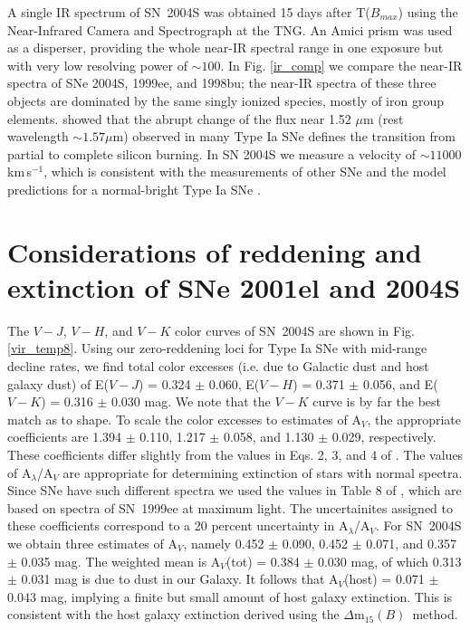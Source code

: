 \documentclass[12pt,preprint,psfig,epsf]{aastex}
\newcommand{\dmm}{\mbox{$\Delta$m$_{15}(B)$}}
\begin{document}
A single IR spectrum of SN~2004S was obtained 15 days after T($B_{max}$)
using the Near-Infrared Camera and Spectrograph at the TNG. An Amici prism
was used as a disperser, providing the whole near-IR spectral range in one
exposure but with very low resolving power of $\sim100$.
In Fig. \ref{ir_comp} we compare the near-IR spectra of SNe 2004S, 1999ee,
and 1998bu; the near-IR spectra of these three objects are dominated
by the same singly ionized species, mostly of iron group elements.
\citet{Mar_etal03} showed that the abrupt change of the flux near
1.52 $\mu$m (rest wavelength $\sim1.57 \mu$m) observed in many Type Ia SNe
defines the transition from partial to complete silicon burning.
In SN 2004S we measure a velocity of $\sim11000$\,km\,s$^{-1}$, which is
consistent with the measurements of other SNe and the model predictions for
a normal-bright Type Ia SNe \citep{Mar_etal03}.


\section {Considerations of reddening and extinction of SNe 2001el and 2004S}


The $V-J$, $V-H$, and $V-K$ color curves of SN~2004S are shown in Fig.
\ref{vir_temp8}. Using our zero-reddening loci for Type Ia SNe with mid-range
decline rates, we find total color excesses (i.e. due to Galactic dust and
host galaxy dust) of E($V-J$) = 0.324 $\pm$ 0.060, E($V-H$) = 0.371 $\pm$
0.056, and E($V-K$) = 0.316 $\pm$ 0.030 mag.  We note that the
$V-K$ curve is by far the best match as to shape.  To scale the color
excesses to estimates of A$_V$, the appropriate coefficients are 
1.394 $\pm$ 0.110, 1.217 $\pm$ 0.058, and 1.130 $\pm$ 0.029, respectively.  These
coefficients differ slightly from the values in Eqs. 2, 3, and 4 of
\citet{Kri_etal04b}.  The \citet{Car_etal89} values of A$_{\lambda}$/A$_V$
are appropriate for determining extinction of stars with normal spectra.
Since SNe have such different spectra we used the values in Table 8
of \citet{Kri_etal06}, which are based on spectra of SN~1999ee at maximum 
light.  The uncertainites assigned to these coefficients correspond to a 20 percent
uncertainty in A$_{\lambda}$/A$_V$.  For SN~2004S we obtain three estimates of A$_V$,
namely 0.452 $\pm$ 0.090, 0.452 $\pm$ 0.071, and 0.357 $\pm$ 0.035
mag. The weighted mean is A$_V$(tot) = 0.384 $\pm$ 0.030 mag, of which 0.313 $\pm$ 
0.031 mag is due to dust in our Galaxy.  It follows that A$_V$(host) = 
0.071 $\pm$ 0.043 mag, implying a finite but small amount of host galaxy
extinction.  This is consistent with the host galaxy extinction derived using
the \dmm\ method.
\end{document}
